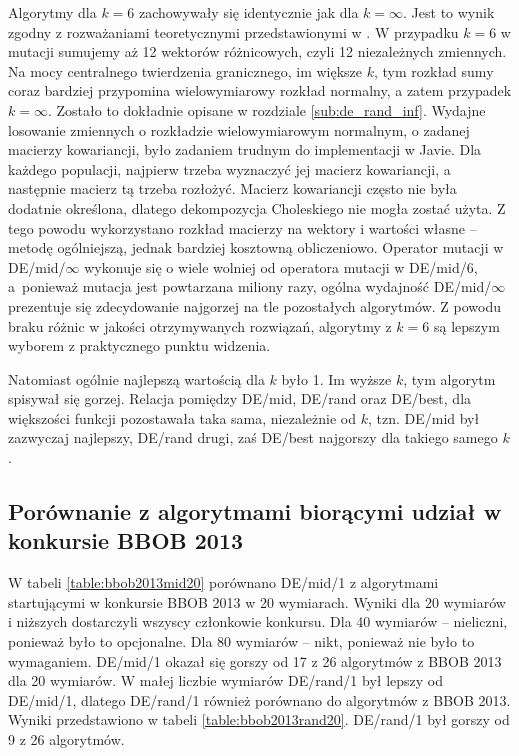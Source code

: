 \documentclass[a4paper,onecolumn,oneside,12pt,wide,floatssmall]{mwrep}
\theoremstyle{definition}
\theoremstyle{plain}%
\theoremstyle{remark}
\begin{document}
Algorytmy dla $k = 6$ zachowywały się identycznie jak dla $k = \infty$. Jest to wynik zgodny
z rozważaniami teoretycznymi przedstawionymi w \cite{decomposition}. 
W przypadku $k = 6$ w mutacji sumujemy aż 12 wektorów różnicowych,
czyli 12 niezależnych zmiennych. Na mocy centralnego twierdzenia granicznego,
im większe $k$, tym rozkład sumy coraz bardziej przypomina wielowymiarowy rozkład normalny,
a zatem przypadek $k=\infty$. Zostało to dokładnie opisane w rozdziale \ref{sub:de_rand_inf}.
Wydajne losowanie zmiennych o rozkładzie wielowymiarowym normalnym, o zadanej
macierzy kowariancji, było zadaniem trudnym do implementacji w Javie.
Dla każdego populacji, najpierw trzeba wyznaczyć jej macierz kowariancji, a następnie macierz
tą trzeba rozłożyć. Macierz kowariancji często nie była dodatnie określona, 
dlatego dekompozycja Choleskiego nie mogła zostać użyta.
Z tego powodu wykorzystano rozkład macierzy na wektory i wartości własne -- metodę ogólniejszą, jednak
bardziej kosztowną obliczeniowo. Operator mutacji w DE/mid/$\infty$ wykonuje się o wiele
wolniej od operatora mutacji w DE/mid/6, a~ponieważ mutacja jest powtarzana miliony
razy, ogólna wydajność DE/mid/$\infty$ prezentuje się zdecydowanie najgorzej na tle pozostałych
algorytmów. Z powodu braku różnic w jakości otrzymywanych rozwiązań,
 algorytmy z $k = 6$ są lepszym wyborem z praktycznego punktu widzenia.

Natomiast ogólnie najlepszą wartością dla $k$ było 1. Im wyższe $k$, tym algorytm spisywał się gorzej.
Relacja pomiędzy DE/mid, DE/rand oraz DE/best, dla większości funkcji pozostawała taka sama, 
niezależnie od $k$, tzn. DE/mid był zazwyczaj najlepszy, DE/rand drugi, zaś DE/best najgorszy
dla takiego samego $k$. 

\subsection{Porównanie z algorytmami biorącymi udział w konkursie BBOB 2013}

W tabeli \ref{table:bbob2013mid20} porównano DE/mid/1 z algorytmami startującymi w konkursie BBOB 2013
w 20 wymiarach.
Wyniki dla 20 wymiarów i niższych dostarczyli wszyscy członkowie konkursu. 
Dla 40 wymiarów -- nieliczni, ponieważ było to opcjonalne.
Dla 80 wymiarów -- nikt, ponieważ nie było to wymaganiem.
DE/mid/1 okazał się gorszy od 17 z 26 algorytmów z BBOB 2013 dla 20 wymiarów. 
W małej liczbie wymiarów DE/rand/1 był lepszy od DE/mid/1, dlatego 
DE/rand/1 również porównano do algorytmów z BBOB 2013. 
Wyniki przedstawiono w tabeli \ref{table:bbob2013rand20}. 
DE/rand/1 był gorszy od 9 z 26 algorytmów.
\end{document}
